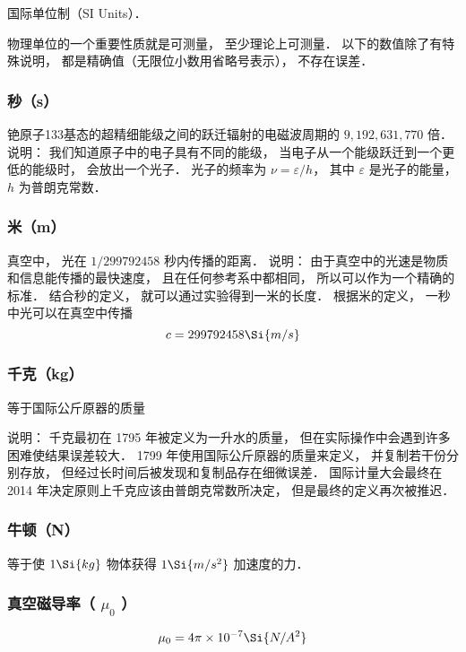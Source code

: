 
国际单位制（SI Units）．

物理单位的一个重要性质就是可测量， 至少理论上可测量． 以下的数值除了有特殊说明， 都是精确值（无限位小数用省略号表示）， 不存在误差．

\subsubsection{秒（s）}
铯原子133基态的超精细能级之间的跃迁辐射的电磁波周期的 $9, 192, 631, 770$ 倍． 
说明： 我们知道原子中的电子具有不同的能级， 当电子从一个能级跃迁到一个更低的能级时， 会放出一个光子． 光子的频率为 $\nu  = \varepsilon /h$，   其中 $\varepsilon $ 是光子的能量， $h$ 为普朗克常数．

\subsubsection{米（m）}
真空中， 光在 $1/299792458$ 秒内传播的距离． 说明： 由于真空中的光速是物质和信息能传播的最快速度， 且在任何参考系中都相同， 所以可以作为一个精确的标准． 结合秒的定义， 就可以通过实验得到一米的长度． 根据米的定义， 一秒中光可以在真空中传播
\begin{equation}
c = 299792458 \Si{m/s}
\end{equation}

\subsubsection{千克（kg）}
等于国际公斤原器的质量


说明： 千克最初在 1795 年被定义为一升水的质量， 但在实际操作中会遇到许多困难使结果误差较大． 1799 年使用国际公斤原器的质量来定义， 并复制若干份分别存放， 但经过长时间后被发现和复制品存在细微误差． 国际计量大会最终在 2014 年决定原则上千克应该由普朗克常数所决定， 但是最终的定义再次被推迟．

\subsubsection{牛顿（N）}
等于使 $1\Si{kg}$ 物体获得 $1\Si{m/s^2}$ 加速度的力．

\subsubsection{真空磁导率（ $\mu_0$ ）}
\begin{equation}
\mu_0 = 4\pi \times 10^{-7} \Si{N/A^2}
\end{equation}

